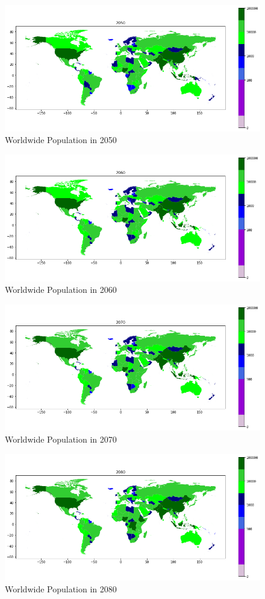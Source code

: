 \documentclass[a4paper, 11pt]{article}
\begin{document}
\begin{figure}[h!]
    \centering
    \includegraphics[width=0.9 \textwidth]{Images_Q2/2050.png}
    \caption{Worldwide Population in 2050}
    \label{fig:figure16}
\end{figure}
\newpage
\begin{figure}[h!]
    \centering
    \includegraphics[width=0.9 \textwidth]{Images_Q2/2060.png}
    \caption{Worldwide Population in 2060}
    \label{fig:figure17}
\end{figure}
\begin{figure}[h!]
    \centering
    \includegraphics[width=0.9 \textwidth]{Images_Q2/2070.png}
    \caption{Worldwide Population in 2070}
    \label{fig:figure18}
\end{figure}
\newpage
\begin{figure}[h!]
    \centering
    \includegraphics[width=0.9 \textwidth]{Images_Q2/2080.png}
    \caption{Worldwide Population in 2080}
    \label{fig:figure19}
\end{figure}
\end{document}
